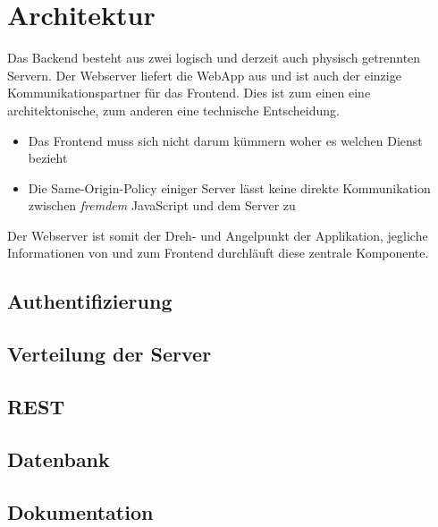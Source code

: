 \section{Architektur}
Das Backend besteht aus zwei logisch und derzeit auch physisch getrennten Servern. 
Der Webserver liefert die \gls{WebApp} aus und ist auch der einzige Kommunikationspartner für das Frontend. Dies ist zum einen eine architektonische, zum anderen eine technische Entscheidung.

\begin{itemize}
\item Das Frontend muss sich nicht darum kümmern woher es welchen Dienst bezieht
\item Die Same-Origin-Policy\cite{sop} einiger Server lässt keine direkte Kommunikation zwischen \emph{fremdem} JavaScript und dem Server zu
\end{itemize}

Der Webserver ist somit der Dreh- und Angelpunkt der Applikation, jegliche Informationen von und zum Frontend durchläuft diese zentrale Komponente.

\subsection{Authentifizierung}

\subsection{Verteilung der Server}

\subsection{REST}

\subsection{Datenbank}

\subsection{Dokumentation}